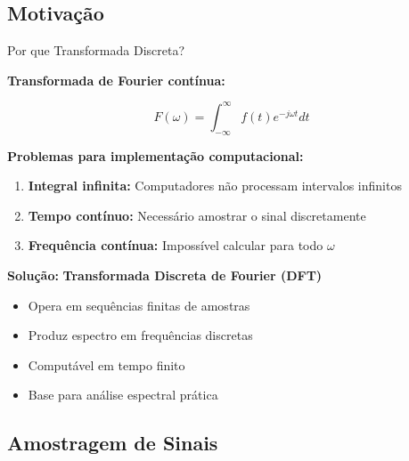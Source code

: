 
\subsection{Motivação}

\begin{frame}{Por que Transformada Discreta?}

\textbf{Transformada de Fourier contínua:}

\[
F(\omega) = \int_{-\infty}^{\infty} f(t) e^{-j\omega t} dt
\]

\textbf{Problemas para implementação computacional:}

\begin{enumerate}
\item \textbf{Integral infinita:} Computadores não processam intervalos infinitos
\item \textbf{Tempo contínuo:} Necessário amostrar o sinal discretamente
\item \textbf{Frequência contínua:} Impossível calcular para todo $\omega$
\end{enumerate}

\vspace{0.1cm}

\textbf{Solução:} \textbf{Transformada Discreta de Fourier (DFT)}

\begin{itemize}
\item Opera em sequências finitas de amostras
\item Produz espectro em frequências discretas
\item Computável em tempo finito
\item Base para análise espectral prática
\end{itemize}

\end{frame}


\subsection{Amostragem de Sinais}

